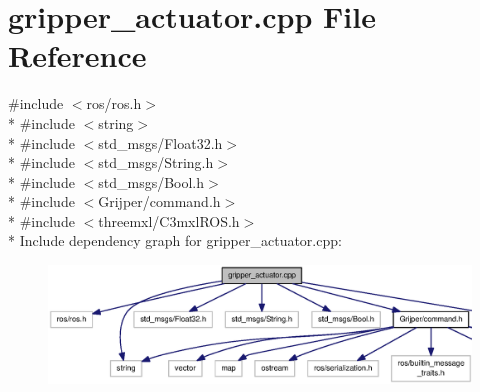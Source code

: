 \section{gripper\-\_\-actuator.\-cpp File Reference}
\label{gripper__actuator_8cpp}
{\ttfamily \#include $<$ros/ros.\-h$>$}\\*
{\ttfamily \#include $<$string$>$}\\*
{\ttfamily \#include $<$std\-\_\-msgs/\-Float32.\-h$>$}\\*
{\ttfamily \#include $<$std\-\_\-msgs/\-String.\-h$>$}\\*
{\ttfamily \#include $<$std\-\_\-msgs/\-Bool.\-h$>$}\\*
{\ttfamily \#include $<$Grijper/command.\-h$>$}\\*
{\ttfamily \#include $<$threemxl/\-C3mxl\-R\-O\-S.\-h$>$}\\*
Include dependency graph for gripper\-\_\-actuator.\-cpp\-:\nopagebreak
\begin{figure}[H]
\begin{center}
\leavevmode
\includegraphics[width=350pt]{gripper__actuator_8cpp__incl}
\end{center}
\end{figure}
